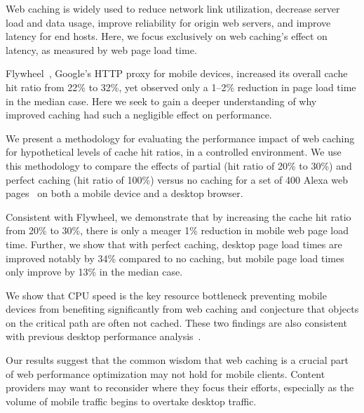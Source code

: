 \label{intro}
Web caching is widely used to reduce network link utilization, decrease server load and data usage, improve reliability for origin web servers, and improve latency for end hosts.
Here, we focus exclusively on web caching's effect on latency, as measured by web page load time.

Flywheel~\cite{flywheel}, Google's HTTP proxy for mobile devices, increased
its overall cache hit ratio from 22\% to 32\%, yet observed only a 1--2\% reduction in page load time in the median case.
Here we seek to gain a deeper understanding of why improved caching had such a negligible effect on performance.


We present a methodology for evaluating the performance impact of web caching for hypothetical levels of cache hit ratios, in a controlled environment.
We use this methodology to compare the effects of partial (hit ratio of 20\% to 30\%) and
perfect caching (hit ratio of 100\%) versus no caching for a set of 400 Alexa web pages~\cite{alexa} on both a mobile device and a desktop browser.

Consistent with Flywheel, we demonstrate that by increasing the cache hit ratio from 20\% to 30\%, there is only a meager 1\% reduction in mobile web page load time.
Further, we show that with perfect caching, desktop page load times are improved notably by 34\% compared to no caching, but mobile page load times only improve by 13\% in the median case.

We show that CPU speed is the key resource bottleneck preventing mobile devices from benefiting significantly from web caching and conjecture that objects on the critical path are often not cached. These two findings are also consistent with previous desktop performance analysis~\cite{wang2013demystifying}.

Our results suggest that the common wisdom that web caching is a crucial part of web performance optimization may not hold for mobile clients. Content providers may want to reconsider where they focus their efforts, especially as the volume of mobile traffic begins to overtake desktop traffic.

